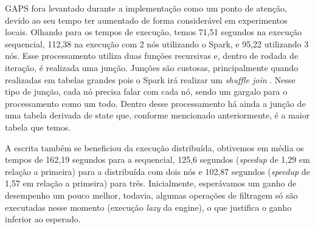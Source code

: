 GAPS fora levantado durante a implementação como um ponto de atenção, devido ao 
seu tempo ter aumentado de forma considerável em experimentos locais. Olhando 
para os tempos de execução, temos 71,51 segundos na execução sequencial, 
112,38 na execução com 2 nós utilizando o Spark, e 95,22 utilizando 3 nós. Esse 
processamento utiliza duas funções recursivas e, dentro de rodada de iteração, 
é realizada uma junção. Junções são custosas, principalmente quando realizadas 
em tabelas grandes pois o Spark irá realizar um \emph{shuffle join} 
\cite{ref:sparkbook}. Nesse tipo de junção, cada nó precisa falar com cada nó, 
sendo um gargalo para o processamento como um todo. Dentro desse processamento 
há ainda a junção de uma tabela derivada de state que, conforme mencionado 
anteriormente, é a maior tabela que temos.

A escrita também se beneficiou da execução distribuída, obtivemos em média os 
tempos de 162,19 segundos para a sequencial, 125,6 segundos (\textit{speedup} 
de 1,29 em relação a primeira) para a distribuída com dois nós e 102,87 
segundos (\textit{speedup} de 1,57 em relação a primeira) para três. 
Inicialmente, esperávamos um ganho de desempenho um pouco melhor, todavia, 
algumas operações de filtragem só são executadas nesse momento (execução 
\textit{lazy} da engine), o que justifica o ganho inferior ao esperado.



